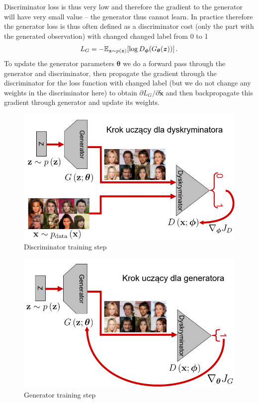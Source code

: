 \documentclass{myclass}
\begin{document}
Discriminator loss is thus very low and therefore the gradient to the generator will have very small
value -- the generator thus cannot learn. In practice therefore the generator loss is thus often
defined as a discriminator cost (only the part with the generated observation) with changed changed
label from 0 to 1
\[
   L_G = - \mathbb{E}_{\bm{z} \sim p(\bm{z})} [\log D_{\bm{\phi}}(G_{\bm{\theta}}(\bm{z}))]\,.
\]
To update the generator parameters $\bm{\theta}$ we do a forward pass through the generator and
discriminator, then propagate the gradient through the discriminator for the loss function with
changed label (but we do not change any weights in the discriminator here) to obtain $\partial L_G /
\partial \bm{\tilde{x}}$ and then backpropagate this gradient through generator and update its
weights.

\begin{figure}[ht]
   \centering
   \includegraphics[width=0.95\columnwidth]{figs/gan_train_1.png}
   \caption{Discriminator training step}
   \label{fig:gan_train_1}
\end{figure}

\begin{figure}[ht]
   \centering
   \includegraphics[width=0.95\columnwidth]{figs/gan_train_2.png}
   \caption{Generator training step}
   \label{fig:gan_train_2}
\end{figure}
\end{document}
